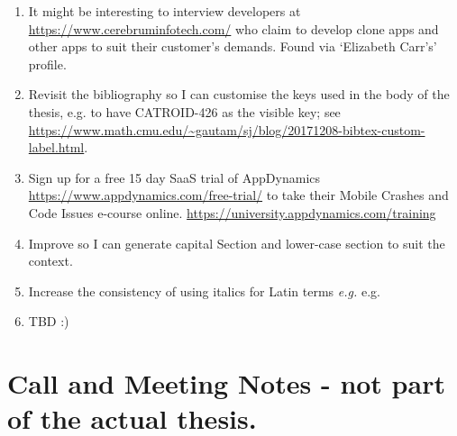 \begin{enumerate}
    \item It might be interesting to interview developers at \url{https://www.cerebruminfotech.com/} who claim to develop clone apps and other apps to suit their customer's demands. Found via `Elizabeth Carr's' profile. 
    
    \item Revisit the bibliography so I can customise the keys used in the body of the thesis, e.g. to have CATROID-426 as the visible key; see \url{https://www.math.cmu.edu/~gautam/sj/blog/20171208-bibtex-custom-label.html}.
    
    \item Sign up for a free 15 day SaaS trial of AppDynamics \url{https://www.appdynamics.com/free-trial/} to take their Mobile Crashes and Code Issues e-course online. \url{https://university.appdynamics.com/training}
    
    \item Improve  so I can generate capital Section and lower-case section to suit the context.
    
    \item Increase the consistency of using italics for Latin terms \emph{e.g.} e.g.
    
    \item TBD :)

\end{enumerate}

\clearpage
\section{Call and Meeting Notes - not part of the actual thesis.}


